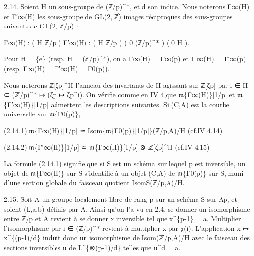 \documentclass[11pt,a4paper]{article}
\begin{document}
2.14. Soient H un sous-groupe de (ℤ/p)\textasciicircum{}*, et d son indice. Nous noterons Γ\textunderscore{}∞(H) et Γ′\textunderscore{}∞(H) les sous-groupe de GL(2, ℤ̂) images réciproques des sous-groupes suivants de GL(2, ℤ/p) :

Γ\textunderscore{}∞(H) : ( H    ℤ/p )        Γ′\textunderscore{}∞(H) : ( H    ℤ/p ) ( 0   (ℤ/p)\textasciicircum{}* )                  ( 0      H  ).

Pour H = \{e\} (resp. H = (ℤ/p)\textasciicircum{}*), on a Γ\textunderscore{}∞(H) = Γ\textunderscore{}∞(p) et Γ′\textunderscore{}∞(H) = Γ′\textunderscore{}∞(p) (resp. Γ\textunderscore{}∞(H) = Γ′\textunderscore{}∞(H) = Γ\textunderscore{}0(p)).

Nous noterons ℤ[ζ\textunderscore{}p]\textasciicircum{}H l'anneau des invariants de H agissant sur ℤ[ζ\textunderscore{}p] par i ∈ H ⊂ (ℤ/p)\textasciicircum{}* ↦ (ζ\textunderscore{}p ↦ ζ\textunderscore{}p\textasciicircum{}i). On vérifie comme en IV 4,que \ensuremath{\mathfrak{m}}\textunderscore{}\{Γ\textunderscore{}∞(H)\}[1/p] et \ensuremath{\mathfrak{m}}\textunderscore{}\{Γ′\textunderscore{}∞(H)\}[1/p] admettent les descriptions suivantes. Si (C,A) est la courbe universelle sur \ensuremath{\mathfrak{m}}\textunderscore{}\{Γ\textunderscore{}0(p)\},

(2.14.1)        \ensuremath{\mathfrak{m}}\textunderscore{}\{Γ\textunderscore{}∞(H)\}[1/p] ≃ Isom\textunderscore{}\{\ensuremath{\mathfrak{m}}\textunderscore{}\{Γ\textunderscore{}0(p)\}[1/p]\}(ℤ/p,A)/H        (cf.IV 4.14)

(2.14.2)        \ensuremath{\mathfrak{m}}\textunderscore{}\{Γ′\textunderscore{}∞(H)\}[1/p] ≃ \ensuremath{\mathfrak{m}}\textunderscore{}\{Γ\textunderscore{}∞(H)\}[1/p] ⊗ ℤ[ζ\textunderscore{}p]\textasciicircum{}H        (cf.IV 4.15)

La formule (2.14.1) signifie que si S est un schéma sur lequel p est inversible, un objet de \ensuremath{\mathfrak{m}}\textunderscore{}\{Γ\textunderscore{}∞(H)\} sur S s'identifie à un objet (C,A) de \ensuremath{\mathfrak{m}}\textunderscore{}\{Γ\textunderscore{}0(p)\} sur S, muni d'une section globale du faisceau quotient Isom\textunderscore{}S(ℤ/p,A)/H.

2.15. Soit A un groupe localement libre de rang p sur un schéma S sur Λ\textunderscore{}p, et soient (L,a,b) définis par A. Ainsi qu'on l'a vu en 2.4, se donner un isomorphisme entre ℤ/p et A revient à se donner x inversible tel que x\textasciicircum{}\{p-1\} = a. Multiplier l'isomorphisme par i ∈ (ℤ/p)\textasciicircum{}* revient à multiplier x par χ(i). L'application x ↦ x\textasciicircum{}\{(p-1)/d\} induit donc un isomorphisme de Isom(ℤ/p,A)/H avec le faisceau des sections inversibles u de L\textasciicircum{}\{⊗(p-1)/d\} telles que u\textasciicircum{}d = a.
\end{document}
